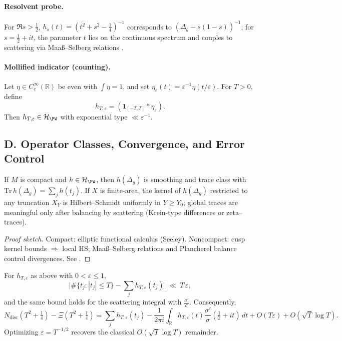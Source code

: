 \paragraph{Resolvent probe.}
For $\Re s>\tfrac12$, $h_s(t)=(t^2+s^2-\tfrac14)^{-1}$ corresponds to $(\Delta_g-s(1-s))^{-1}$; for $s=\tfrac12+it$, the parameter $t$ lies on the continuous spectrum and couples to scattering via Maaß–Selberg relations \cite{LaxPhillips1976}.

\paragraph{Mollified indicator (counting).}
Let $\eta\in C_c^\infty(\mathbb R)$ be even with $\int\eta=1$, and set $\eta_\varepsilon(t)=\varepsilon^{-1}\eta(t/\varepsilon)$. For $T>0$, define
\[
  h_{T,\varepsilon}=(\mathbf 1_{[-T,T]}*\eta_\varepsilon).
\]
Then $h_{T,\varepsilon}\in\mathcal H_{\PW}$ with exponential type $\ll\varepsilon^{-1}$.


\subsection*{D. Operator Classes, Convergence, and Error Control}
\label{subsec:operator-classes-sharp-patched}

\begin{lemma}
\label{lem:tc-hs-sharp-patched}
If $M$ is compact and $h\in\mathcal H_{\PW}$, then $h(\Delta_g)$ is smoothing and trace class with $\mathrm{Tr}\,h(\Delta_g)=\sum_j h(t_j)$. If $X$ is finite-area, the kernel of $h(\Delta_g)$ restricted to any truncation $X_Y$ is Hilbert–Schmidt uniformly in $Y\ge Y_0$; global traces are meaningful only after balancing by scattering (Krein-type differences or zeta–traces).
\end{lemma}

\begin{proof}[Proof sketch]
Compact: elliptic functional calculus (Seeley). Noncompact: cusp kernel bounds $\Rightarrow$ local HS; Maaß–Selberg relations and Plancherel balance control divergences. See \cite{Seeley1967,Hejhal1983II,JorgensonLang}.
\end{proof}

\begin{lemma}
\label{lem:indicator-error-sharp-patched}
For $h_{T,\varepsilon}$ as above with $0<\varepsilon\le 1$,
\[
  \bigg|\#\{t_j:|t_j|\le T\}-\sum_j h_{T,\varepsilon}(t_j)\bigg|\ \ll\ T\,\varepsilon,
\]
and the same bound holds for the scattering integral with $\frac{\sigma'}{\sigma}$. Consequently,
\[
 N_{\mathrm{disc}}(T^2+\tfrac14)-\Xi(T^2+\tfrac14)
 = \sum_j h_{T,\varepsilon}(t_j)-\frac{1}{2\pi i}\int_{\mathbb R}h_{T,\varepsilon}(t)\frac{\sigma'}{\sigma}(\tfrac12+it)\,dt + O(T\varepsilon)+O(\sqrt{T}\log T).
\]
Optimizing $\varepsilon=T^{-1/2}$ recovers the classical $O(\sqrt{T}\log T)$ remainder.
\end{lemma}

